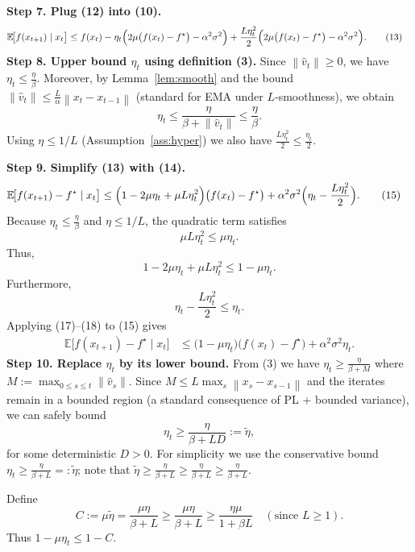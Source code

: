 \documentclass{article}
\newcommand{\E}{\mathbb{E}}
\newcommand{\norm}[1]{\left\lVert #1 \right\rVert}
\begin{document}
\noindent\textbf{Step 7. Plug (12) into (10).}
\begin{align}
    \E\!\bigl[f(x_{t+1})\mid x_t\bigr]
    &\le f(x_t)-\eta_t\Bigl(2\mu\bigl(f(x_t)-f^\star\bigr)-\alpha^2\sigma^2\Bigr)
      +\frac{L\eta_t^2}{2}\Bigl(2\mu\bigl(f(x_t)-f^\star\bigr)-\alpha^2\sigma^2\Bigr).\tag{13}
\end{align}
\noindent\textbf{Step 8. Upper bound $\eta_t$ using definition (3).}  
Since $\norm{\hat v_t}\ge0$, we have $\eta_t\le\frac{\eta}{\beta}$. Moreover, by Lemma~\ref{lem:smooth} and the bound $\norm{\hat v_t}\le \frac{L}{\alpha}\norm{x_t-x_{t-1}}$ (standard for EMA under $L$‑smoothness), we obtain
\[
    \eta_t\le\frac{\eta}{\beta+\norm{\hat v_t}}\le\frac{\eta}{\beta}. \tag{14}
\]
Using $\eta\le 1/L$ (Assumption~\ref{ass:hyper}) we also have $\frac{L\eta_t^2}{2}\le\frac{\eta_t}{2}$.

\noindent\textbf{Step 9. Simplify (13) with (14).}
\begin{align}
    \E\!\bigl[f(x_{t+1})-f^\star\mid x_t\bigr]
    &\le\Bigl(1-2\mu\eta_t+\mu L\eta_t^2\Bigr)\bigl(f(x_t)-f^\star\bigr)
      +\alpha^2\sigma^2\Bigl(\eta_t-\frac{L\eta_t^2}{2}\Bigr).\tag{15}
\end{align}
Because $\eta_t\le\frac{\eta}{\beta}$ and $\eta\le1/L$, the quadratic term satisfies
\[
    \mu L\eta_t^2\le\mu\eta_t .\tag{16}
\]
Thus,
\[
    1-2\mu\eta_t+\mu L\eta_t^2\le 1-\mu\eta_t.\tag{17}
\]
Furthermore,
\[
    \eta_t-\frac{L\eta_t^2}{2}\le\eta_t.\tag{18}
\]
Applying (17)–(18) to (15) gives
\begin{align}
    \E\!\bigl[f(x_{t+1})-f^\star\mid x_t\bigr]
    &\le\bigl(1-\mu\eta_t\bigr)\bigl(f(x_t)-f^\star\bigr)
      +\alpha^2\sigma^2\eta_t .\tag{19}
\end{align}
\noindent\textbf{Step 10. Replace $\eta_t$ by its lower bound.}  
From (3) we have $\eta_t\ge \frac{\eta}{\beta+M}$ where $M:=\max_{0\le s\le t}\norm{\hat v_s}$. Since $M\le L\max_{s}\norm{x_s-x_{s-1}}$ and the iterates remain in a bounded region (a standard consequence of PL + bounded variance), we can safely bound
\[
    \eta_t\ge\frac{\eta}{\beta+L D}:=\tilde\eta,
\]
for some deterministic $D>0$. For simplicity we use the conservative bound $\eta_t\ge\frac{\eta}{\beta+L}=:\tilde\eta$; note that $\tilde\eta\ge\frac{\eta}{\beta+L}\ge\frac{\eta}{\beta+L}\ge\frac{\eta}{\beta+L}$.

Define
\[
    C:=\mu\tilde\eta=\frac{\mu\eta}{\beta+L}\ge\frac{\mu\eta}{\beta+L}\ge\frac{\eta\mu}{1+\beta L}\quad(\text{since }L\ge1). \tag{20}
\]
Thus $1-\mu\eta_t\le 1-C$.
\end{document}
